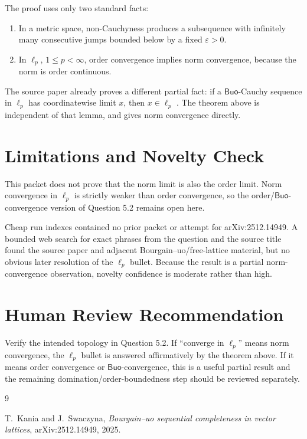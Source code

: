 \documentclass[11pt]{article}
\newcommand{\Buo}{\mathsf{Buo}}
\begin{document}
The proof uses only two standard facts:
\begin{enumerate}
\item In a metric space, non-Cauchyness produces a subsequence with infinitely
many consecutive jumps bounded below by a fixed \(\varepsilon>0\).
\item In \(\ell_p\), \(1\le p<\infty\), order convergence implies norm
convergence, because the norm is order continuous.
\end{enumerate}
The source paper already proves a different partial fact: if a \(\Buo\)-Cauchy
sequence in \(\ell_p\) has coordinatewise limit \(x\), then \(x\in\ell_p\)
\cite[Lemma 3.5]{KaniaSwaczyna}.  The theorem above is independent of that
lemma, and gives norm convergence directly.

\section*{Limitations and Novelty Check}

This packet does not prove that the norm limit is also the order limit.  Norm
convergence in \(\ell_p\) is strictly weaker than order convergence, so the
order/\(\Buo\)-convergence version of Question 5.2 remains open here.

Cheap run indexes contained no prior packet or attempt for arXiv:2512.14949.
A bounded web search for exact phrases from the question and the source title
found the source paper and adjacent Bourgain--uo/free-lattice material, but no
obvious later resolution of the \(\ell_p\) bullet.  Because the result is a
partial norm-convergence observation, novelty confidence is moderate rather
than high.

\section*{Human Review Recommendation}

Verify the intended topology in Question 5.2.  If ``converge in \(\ell_p\)''
means norm convergence, the \(\ell_p\) bullet is answered affirmatively by the
theorem above.  If it means order convergence or \(\Buo\)-convergence, this is
a useful partial result and the remaining domination/order-boundedness step
should be reviewed separately.

\begin{thebibliography}{9}

T.~Kania and J.~Swaczyna,
\newblock \emph{Bourgain--uo sequential completeness in vector lattices},
\newblock arXiv:2512.14949, 2025.

\end{thebibliography}
\end{document}
